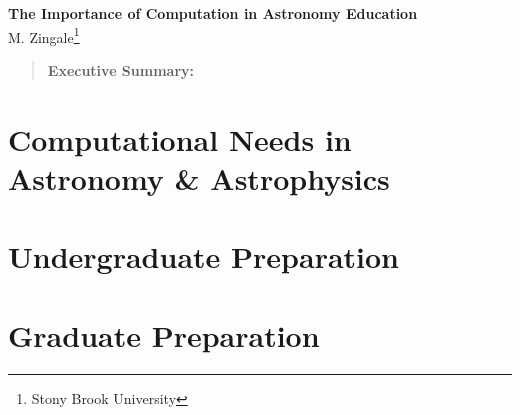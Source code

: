 \documentclass[11pt]{article}
\begin{document}
\thispagestyle{plain}

\begin{center}
{\Large \sffamily \bfseries The Importance of Computation in Astronomy Education} \\
{M. Zingale\footnote{Stony Brook University}}
\end{center}

\begin{quote}
{\sffamily \bfseries Executive Summary:}
\end{quote}

\section{Computational Needs in Astronomy \& Astrophysics}

\section{Undergraduate Preparation}

\section{Graduate Preparation}
\end{document}
